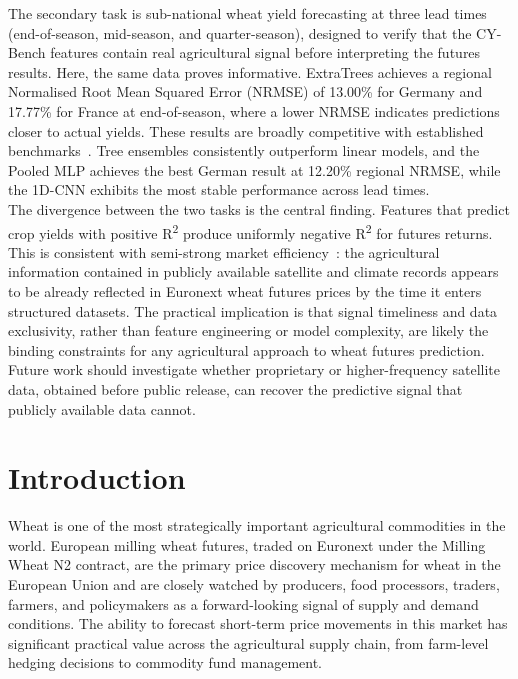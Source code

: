 \documentclass[pdflatex,sn-mathphys-num, oneside, 11pt]{sn-jnl}%
\theoremstyle{thmstyleone}%
\theoremstyle{thmstyletwo}%
\theoremstyle{thmstylethree}%
\begin{document}
The secondary task is sub-national wheat yield forecasting at three lead times (end-of-season, mid-season, and quarter-season), designed to verify that the CY-Bench features contain real agricultural signal before interpreting the futures results. Here, the same data proves informative. ExtraTrees achieves a regional Normalised Root Mean Squared Error (NRMSE) of 13.00\% for Germany and 17.77\% for France at end-of-season, where a lower NRMSE indicates predictions closer to actual yields. These results are broadly competitive with established benchmarks~\cite{bib16}. Tree ensembles consistently outperform linear models, and the Pooled MLP achieves the best German result at 12.20\% regional NRMSE, while the 1D-CNN exhibits the most stable performance across lead times.\\

The divergence between the two tasks is the central finding. Features that predict crop yields with positive R\textsuperscript{2} produce uniformly negative R\textsuperscript{2} for futures returns. This is consistent with semi-strong market efficiency~\cite{bib30}: the agricultural information contained in publicly available satellite and climate records appears to be already reflected in Euronext wheat futures prices by the time it enters structured datasets. The practical implication is that signal timeliness and data exclusivity, rather than feature engineering or model complexity, are likely the binding constraints for any agricultural approach to wheat futures prediction. Future work should investigate whether proprietary or higher-frequency satellite data, obtained before public release, can recover the predictive signal that publicly available data cannot.

\clearpage

\tableofcontents

\clearpage

\section{Introduction}\label{intro}

Wheat is one of the most strategically important agricultural commodities in the world. European milling wheat futures, traded on Euronext under the Milling Wheat N2 contract, are the primary price discovery mechanism for wheat in the European Union and are closely watched by producers, food processors, traders, farmers, and policymakers as a forward-looking signal of supply and demand conditions. The ability to forecast short-term price movements in this market has significant practical value across the agricultural supply chain, from farm-level hedging decisions to commodity fund management.\\
\end{document}
